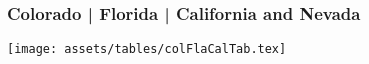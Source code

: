 \begin{frame}
    \frametitle{Colorado | Florida | California and Nevada}

    \texttt{[image: assets/tables/colFlaCalTab.tex]}

\end{frame}